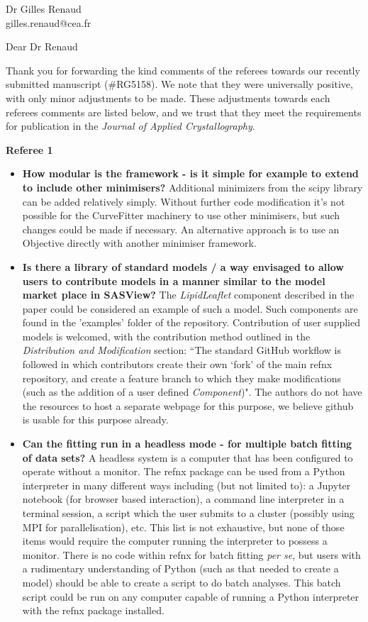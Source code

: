 \documentclass[fontsize=12pt, paper=a4]{scrlttr2}
\begin{document}
\begin{letter}{Dr Gilles Renaud \\ gilles.renaud@cea.fr}

\opening{Dear Dr Renaud}  %
Thank you for forwarding the kind comments of the referees towards our recently submitted manuscript (\#RG5158). We note that they were universally positive, with only minor adjustments to be made. These adjustments towards each referees comments are listed below, and we trust that they meet the requirements for publication in the \emph{Journal of Applied Crystallography}.

\vskip12pt
\noindent
\textbf{Referee 1}
\begin{itemize}
\item \textbf{How modular is the framework - is it simple for example to extend to include other minimisers?} Additional minimizers from the scipy library can be added relatively simply. Without further code modification it's not possible for the CurveFitter machinery to use other minimisers, but such changes could be made if necessary. An alternative approach is to use an Objective directly with another minimiser framework.
\item \textbf{Is there a library of standard models / a way envisaged to allow users to contribute models in a manner similar to the model market place in SASView?} The \emph{LipidLeaflet} component described in the paper could be considered an example of such a model. Such components are found in the 'examples' folder of the repository. Contribution of user supplied models is welcomed, with the contribution method outlined in the \emph{Distribution and Modification} section: ``The standard GitHub workflow is followed in which contributors create their own `fork' of the main refnx repository, and create a feature branch to which they make modifications (such as the addition of a user defined \emph{Component})". The authors do not have the resources to host a separate webpage for this purpose, we believe github is usable for this purpose already.
\item \textbf{Can the fitting run in a headless mode - for multiple batch fitting of data sets?} A headless system is a computer that has been configured to operate without a monitor. The refnx package can be used from a Python interpreter in many different ways including (but not limited to): a Jupyter notebook (for browser based interaction), a command line interpreter in a terminal session, a script which the user submits to a cluster (possibly using MPI for parallelisation), etc. This list is not exhaustive, but none of those items would require the computer running the interpreter to possess a monitor. There is no code within refnx for batch fitting \emph{per se}, but users with a rudimentary understanding of Python (such as that needed to create a model) should be able to create a script to do batch analyses. This batch script could be run on any computer capable of running a Python interpreter with the refnx package installed.

\end{itemize}
\end{letter}
\end{document}
